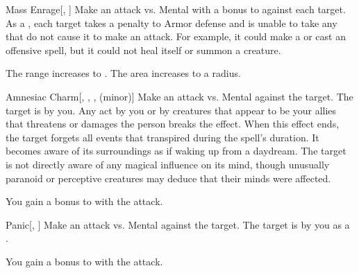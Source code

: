\lowercase{\hypertarget{spell:Mass Enrage}{}}\label{spell:Mass Enrage}
\begin{freeability}[Rank 4]{\hypertarget{spell:Mass Enrage}{Mass Enrage}}[, ]
Make an attack vs. Mental with a  bonus to  against each target.
\hit As a , each target takes a  penalty to Armor defense and is unable to take any  that do not cause it to make an attack.
For example, it could make a  or cast an offensive spell, but it could not heal itself or summon a creature.

\rankline
{} The range increases to \rnglong.
 The area increases to a \arealarge radius.

\end{freeability}
\vspace{0.25em}



\lowercase{\hypertarget{spell:Amnesiac Charm}{}}\label{spell:Amnesiac Charm}
\begin{freeability}[Rank 6]{\hypertarget{spell:Amnesiac Charm}{Amnesiac Charm}}[, , ,  (minor)]
Make an attack vs. Mental against the target.
\hit The target is \charmed by you.
Any act by you or by creatures that appear to be your allies that threatens or damages the  person breaks the effect.
When this effect ends, the target forgets all events that transpired during the spell's duration.
It becomes aware of its surroundings as if waking up from a daydream.
The target is not directly aware of any magical influence on its mind, though unusually paranoid or perceptive creatures may deduce that their minds were affected.

\rankline
{} You gain a  bonus to  with the attack.

\end{freeability}
\vspace{0.25em}



\lowercase{\hypertarget{spell:Panic}{}}\label{spell:Panic}
\begin{freeability}[Rank 6]{\hypertarget{spell:Panic}{Panic}}[, ]
Make an attack vs. Mental against the target.
\hit The target is \panicked by you as a .

\rankline
{} You gain a  bonus to  with the attack.

\end{freeability}
\vspace{0.25em}




